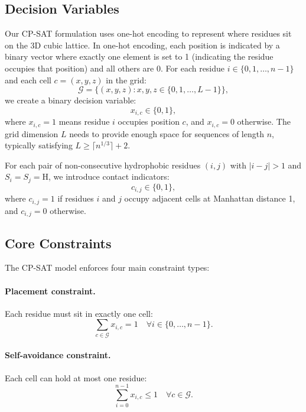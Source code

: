 \documentclass[12pt, oneside, openany]{book}
\theoremstyle{plain}
\theoremstyle{definition}
\begin{document}
\subsection{Decision Variables}

Our CP-SAT formulation uses one-hot encoding to represent where residues sit on the 3D cubic lattice. In one-hot encoding, each position is indicated by a binary vector where exactly one element is set to 1 (indicating the residue occupies that position) and all others are 0. For each residue $i \in \{0, 1, \ldots, n-1\}$ and each cell $c = (x, y, z)$ in the grid:
\begin{equation}
\mathcal{G} = \{(x,y,z) : x,y,z \in \{0, 1, \ldots, L-1\}\},
\end{equation}
we create a binary decision variable:
\begin{equation}
x_{i,c} \in \{0, 1\},
\end{equation}
where $x_{i,c} = 1$ means residue $i$ occupies position $c$, and $x_{i,c} = 0$ otherwise. The grid dimension $L$ needs to provide enough space for sequences of length $n$, typically satisfying $L \geq \lceil n^{1/3} \rceil + 2$.

For each pair of non-consecutive hydrophobic residues $(i,j)$ with $|i-j| > 1$ and $S_i = S_j = \text{H}$, we introduce contact indicators:
\begin{equation}
c_{i,j} \in \{0, 1\},
\end{equation}
where $c_{i,j} = 1$ if residues $i$ and $j$ occupy adjacent cells at Manhattan distance 1, and $c_{i,j} = 0$ otherwise.

\subsection{Core Constraints}

The CP-SAT model enforces four main constraint types:

\paragraph{Placement constraint.} Each residue must sit in exactly one cell:
\begin{equation}
\sum_{c \in \mathcal{G}} x_{i,c} = 1 \quad \forall i \in \{0, \ldots, n-1\}.
\end{equation}

\paragraph{Self-avoidance constraint.} Each cell can hold at most one residue:
\begin{equation}
\sum_{i=0}^{n-1} x_{i,c} \leq 1 \quad \forall c \in \mathcal{G}.
\end{equation}
\end{document}
